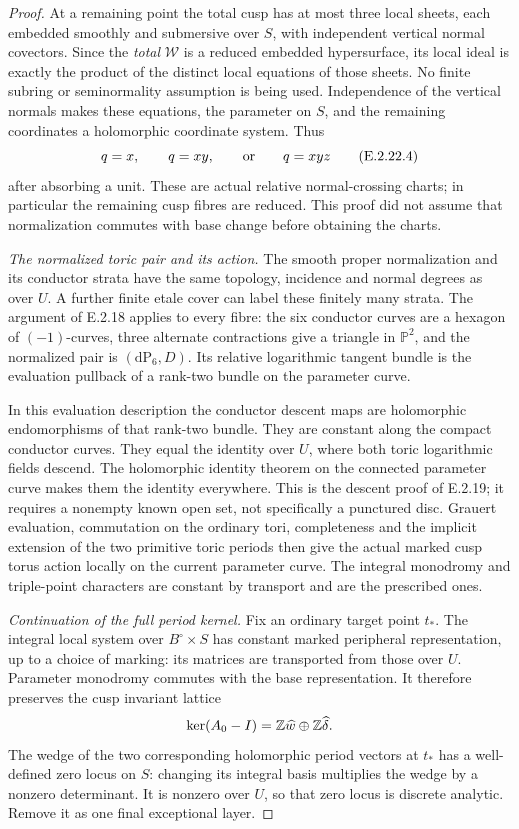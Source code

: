 \begin{proof}
At a remaining point the total cusp
has at most three local sheets, each
embedded smoothly and submersive over
$S$, with independent vertical normal
covectors.  Since the \emph{total}
$\mathcal W$ is a reduced embedded
hypersurface, its local ideal is exactly
the product of the distinct local
equations of those sheets.  No finite
subring or seminormality assumption
is being used.  Independence of the
vertical normals makes these equations,
the parameter on $S$, and the remaining
coordinates a holomorphic coordinate
system.  Thus
\[
 q=x,\qquad q=xy,\qquad\hbox{or}\qquad q=xyz
 \tag{E.2.22.4}
\]
after absorbing a unit.  These are
actual relative normal-crossing charts;
in particular the remaining cusp fibres
are reduced.  This proof did not assume
that normalization commutes with base
change before obtaining the charts.

\emph{The normalized toric pair and its action.}
The smooth proper normalization and
its conductor strata have the same
topology, incidence and normal degrees
as over $U$.  A further finite etale
cover can label these finitely many
strata.  The argument of E.2.18 applies
to every fibre: the six conductor
curves are a hexagon of $(-1)$-curves,
three alternate contractions give a
triangle in $\mathbb P^2$, and the
normalized pair is $(\mathrm{dP}_6,D)$.
Its relative logarithmic tangent bundle
is the evaluation pullback of a rank-two
bundle on the parameter curve.

In this evaluation description the
conductor descent maps are holomorphic
endomorphisms of that rank-two bundle.
They are constant along the compact
conductor curves.  They equal the identity
over $U$, where both toric logarithmic
fields descend.  The holomorphic identity
theorem on the connected parameter curve
makes them the identity everywhere.
This is the descent proof of E.2.19;
it requires a nonempty known open set,
not specifically a punctured disc.
Grauert evaluation, commutation on the
ordinary tori, completeness and the
implicit extension of the two primitive
toric periods then give the actual
marked cusp torus action locally on
the current parameter curve.  The
integral monodromy and triple-point
characters are constant by transport
and are the prescribed ones.

\emph{Continuation of the full period kernel.}
Fix an ordinary target point $t_*$.
The integral local system over
$B^\circ\times S$ has constant marked
peripheral representation, up to a
choice of marking: its matrices are
transported from those over $U$.
Parameter monodromy commutes with the
base representation.  It therefore
preserves the cusp invariant lattice
\[
 \ker(A_0-I)=\mathbb Z\widehat w\oplus\mathbb Z\widehat\delta.
\]
The wedge of the two corresponding
holomorphic period vectors at $t_*$
has a well-defined zero locus on $S$:
changing its integral basis multiplies
the wedge by a nonzero determinant.
It is nonzero over $U$, so that zero
locus is discrete analytic.  Remove
it as one final exceptional layer.


\end{proof}
